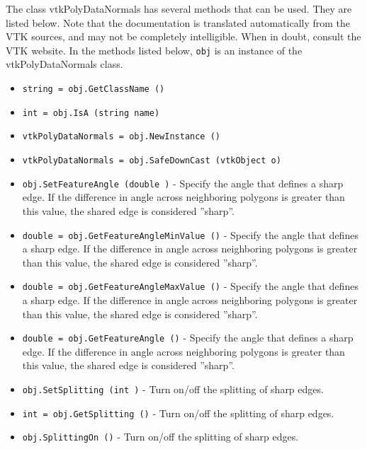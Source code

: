 The class vtkPolyDataNormals has several methods that can be used.
  They are listed below.
Note that the documentation is translated automatically from the VTK sources,
and may not be completely intelligible.  When in doubt, consult the VTK website.
In the methods listed below, \verb|obj| is an instance of the vtkPolyDataNormals class.
\begin{itemize}
\item  \verb|string = obj.GetClassName ()|

\item  \verb|int = obj.IsA (string name)|

\item  \verb|vtkPolyDataNormals = obj.NewInstance ()|

\item  \verb|vtkPolyDataNormals = obj.SafeDownCast (vtkObject o)|

\item  \verb|obj.SetFeatureAngle (double )| -  Specify the angle that defines a sharp edge. If the difference in
 angle across neighboring polygons is greater than this value, the
 shared edge is considered ''sharp''.

\item  \verb|double = obj.GetFeatureAngleMinValue ()| -  Specify the angle that defines a sharp edge. If the difference in
 angle across neighboring polygons is greater than this value, the
 shared edge is considered ''sharp''.

\item  \verb|double = obj.GetFeatureAngleMaxValue ()| -  Specify the angle that defines a sharp edge. If the difference in
 angle across neighboring polygons is greater than this value, the
 shared edge is considered ''sharp''.

\item  \verb|double = obj.GetFeatureAngle ()| -  Specify the angle that defines a sharp edge. If the difference in
 angle across neighboring polygons is greater than this value, the
 shared edge is considered ''sharp''.

\item  \verb|obj.SetSplitting (int )| -  Turn on/off the splitting of sharp edges.

\item  \verb|int = obj.GetSplitting ()| -  Turn on/off the splitting of sharp edges.

\item  \verb|obj.SplittingOn ()| -  Turn on/off the splitting of sharp edges.


\end{itemize}
